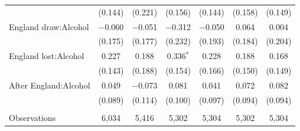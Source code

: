 \documentclass[12pt, letterpaper]{article}
\begin{document}
\begin{table}
{\begin{tabular}{@{\extracolsep{5pt}}lcccccc}
  & (0.144) & (0.221) & (0.156) & (0.144) & (0.158) & (0.149) \\ 
  England draw:Alcohol & $-$0.060 & $-$0.051 & $-$0.312 & $-$0.050 & 0.064 & 0.004 \\ 
  & (0.175) & (0.177) & (0.232) & (0.193) & (0.184) & (0.204) \\ 
  England lost:Alcohol & 0.227 & 0.188 & 0.336$^{*}$ & 0.228 & 0.188 & 0.168 \\ 
  & (0.143) & (0.188) & (0.154) & (0.166) & (0.150) & (0.149) \\ 
  After England:Alcohol & 0.049 & $-$0.073 & 0.081 & 0.041 & 0.072 & 0.082 \\ 
  & (0.089) & (0.114) & (0.100) & (0.097) & (0.094) & (0.094) \\ 
 \hline \\[-1.8ex] 
Observations & 6,034 & 5,416 & 5,302 & 5,304 & 5,302 & 5,304 \\ 
\hline 

\end{tabular}}
\end{table}

\newpage
\end{document}
